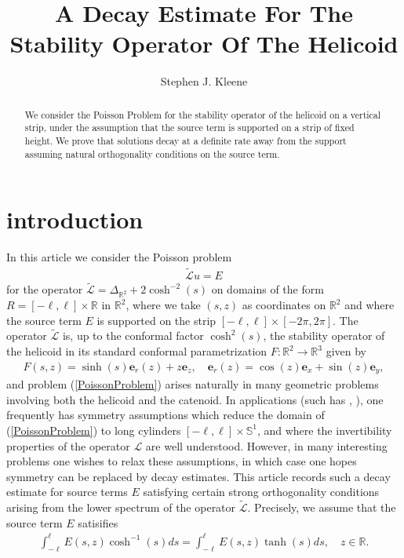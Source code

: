 \documentclass{amsart}
\title{A Decay Estimate For The Stability Operator Of The Helicoid}
\author{Stephen J. Kleene}
\newcommand{\e}[0]{\mathbf e}
\newcommand{\mb}{\mathbb}
\newcommand{\mc}{\mathcal}
\newcommand{\wt}{\widetilde}
\begin{document}
\maketitle
\begin{abstract}
We consider the Poisson Problem for the stability operator of the helicoid on a  vertical strip, under the assumption that the source term is supported on a strip of fixed height. We prove that solutions decay at a definite rate away from the support assuming natural orthogonality conditions on the source term.
\end{abstract}


\section{introduction}
In this article we consider the Poisson problem
\begin{align} \label{PoissonProblem}
\wt{\mc{L}}u = E
\end{align}
for the operator $\wt{\mc{L}} = \Delta_{\mb{R}^2} + 2 \cosh^{-2}(s)$ on domains of the form $R = [-\ell, \ell] \times \mb{R}$ in $\mb{R}^2$,  where we take $(s, z)$ as coordinates on $\mb{R}^2$ and where the source term  $E$ is supported on the strip $ [-\ell, \ell] \times [-2 \pi, 2 \pi]$. The operator $\wt{\mc{L}}$ is, up to the conformal factor $\cosh^{2}(s)$,  the stability operator of the helicoid in its standard conformal parametrization $F: \mb{R}^2 \rightarrow \mb{R}^3$  given by
\begin{align}\label{HelicoidParametrization}
F(s, z) = \sinh(s) \e_r(z) + z \e_z, \quad \e_{r}(z) = \cos(z) \e_x + \sin(z) \e_y,
\end{align}
and problem (\ref{PoissonProblem}) arises naturally in many geometric problems  involving both the  helicoid and the catenoid. In applications (such has \cite{BK}, \cite{BK2}), one frequently has symmetry assumptions which reduce the domain of (\ref{PoissonProblem}) to long cylinders  $[-\ell, \ell] \times \mb{S}^1$, and where the invertibility properties of the operator $\mc{L}$ are well understood. However,  in many interesting problems one wishes to relax these assumptions, in which case one hopes  symmetry  can be replaced by decay estimates. This article records such a decay estimate for source terms $E$  satisfying certain strong orthogonality conditions arising from  the lower  spectrum of the operator $\wt{\mc{L}}$. Precisely, we assume that the source term $E$ satisifies
\begin{align}\label{StrongOrthogonality}
\int_{-\ell}^{\ell} E(s, z) \cosh^{-1}(s)ds = \int_{-\ell}^{\ell} E(s, z) \tanh(s)ds, \quad z \in \mb{R}.
\end{align}
\end{document}
